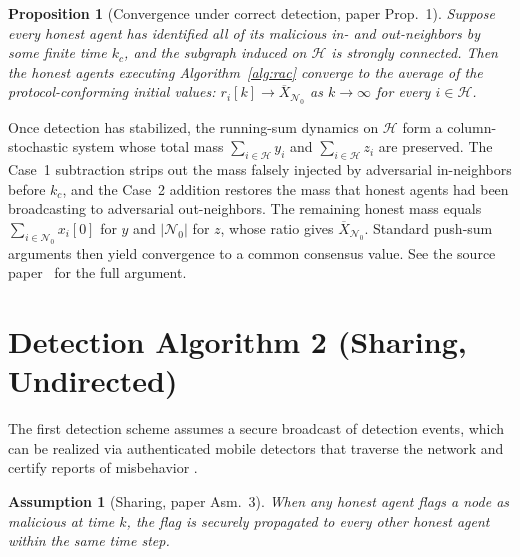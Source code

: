 \documentclass[journal]{IEEEtran}
\newtheorem{proposition}{Proposition}
\newtheorem{assumption}{Assumption}
\newcommand{\NN}{\mathcal{N}}
\newcommand{\HH}{\mathcal{H}}
\begin{document}
\begin{proposition}[Convergence under correct detection, paper Prop.~1]
\label{prop:conv}
Suppose every honest agent has identified all of its malicious in- and
out-neighbors by some finite time $k_c$, and the subgraph induced on $\HH$ is
strongly connected.  Then the honest agents executing Algorithm~\ref{alg:rac}
converge to the average of the protocol-conforming initial values:
$r_i[k]\to \overline{X}_{\NN_0}$ as $k\to\infty$ for every $i\in\HH$.
\end{proposition}

\begin{IEEEproof}[Sketch]
Once detection has stabilized, the running-sum dynamics on $\HH$ form a
column-stochastic system whose total mass $\sum_{i\in\HH}y_i$ and
$\sum_{i\in\HH}z_i$ are preserved.  The Case~1 subtraction strips out the
mass falsely injected by adversarial in-neighbors before $k_c$, and the
Case~2 addition restores the mass that honest agents had been broadcasting
to adversarial out-neighbors.  The remaining honest mass equals
$\sum_{i\in\NN_0}x_i[0]$ for $y$ and $|\NN_0|$ for $z$, whose ratio gives
$\overline{X}_{\NN_0}$.  Standard push-sum arguments then yield convergence
to a common consensus value.  See the source paper~\cite{yuan2024resilient}
for the full argument.
\end{IEEEproof}

\section{Detection Algorithm 2 (Sharing, Undirected)}
\label{sec:alg2}

The first detection scheme assumes a secure broadcast of detection events,
which can be realized via authenticated mobile detectors that traverse the
network and certify reports of misbehavior \cite{zhao2018resilient}.

\begin{assumption}[Sharing, paper Asm.~3]
\label{asm:sharing}
When any honest agent flags a node as malicious at time $k$, the flag is
securely propagated to every other honest agent within the same time step.
\end{assumption}
\end{document}
